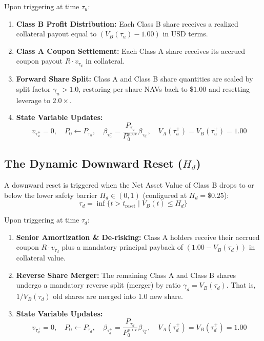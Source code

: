 \documentclass[11pt,a4paper]{article}
\begin{document}
Upon triggering at time $\tau_u$:
\begin{enumerate}
    \item \textbf{Class B Profit Distribution:} Each Class B share receives a realized collateral payout equal to $(V_B(\tau_u) - 1.00)$ in USD terms.
    \item \textbf{Class A Coupon Settlement:} Each Class A share receives its accrued coupon payout $R \cdot v_{\tau_u}$ in collateral.
    \item \textbf{Forward Share Split:} Class A and Class B share quantities are scaled by split factor $\gamma_u > 1.0$, restoring per-share NAVs back to $\$1.00$ and resetting leverage to $2.0\times$.
    \item \textbf{State Variable Updates:}
    \begin{equation}
        v_{\tau_u^+} = 0, \quad P_0 \leftarrow P_{\tau_u}, \quad \beta_{\tau_u^+} = \frac{P_{\tau_u}}{P_0^{\text{prev}}} \beta_{\tau_u^-}, \quad V_A(\tau_u^+) = V_B(\tau_u^+) = 1.00
    \end{equation}
\end{enumerate}

\subsection{The Dynamic Downward Reset ($H_d$)}
A downward reset is triggered when the Net Asset Value of Class B drops to or below the lower safety barrier $H_d \in (0, 1)$ (configured at $H_d = \$0.25$):
\begin{equation}
    \tau_d = \inf \{ t > t_{\text{reset}} \mid V_B(t) \le H_d \}
\end{equation}

Upon triggering at time $\tau_d$:
\begin{enumerate}
    \item \textbf{Senior Amortization \& De-risking:} Class A holders receive their accrued coupon $R \cdot v_{\tau_d}$ plus a mandatory principal payback of $(1.00 - V_B(\tau_d))$ in collateral value.
    \item \textbf{Reverse Share Merger:} The remaining Class A and Class B shares undergo a mandatory reverse split (merger) by ratio $\gamma_d = V_B(\tau_d)$. That is, $1 / V_B(\tau_d)$ old shares are merged into $1.0$ new share.
    \item \textbf{State Variable Updates:}
    \begin{equation}
        v_{\tau_d^+} = 0, \quad P_0 \leftarrow P_{\tau_d}, \quad \beta_{\tau_d^+} = \frac{P_{\tau_d}}{P_0^{\text{prev}}} \beta_{\tau_d^-}, \quad V_A(\tau_d^+) = V_B(\tau_d^+) = 1.00
    \end{equation}
\end{enumerate}
\end{document}
